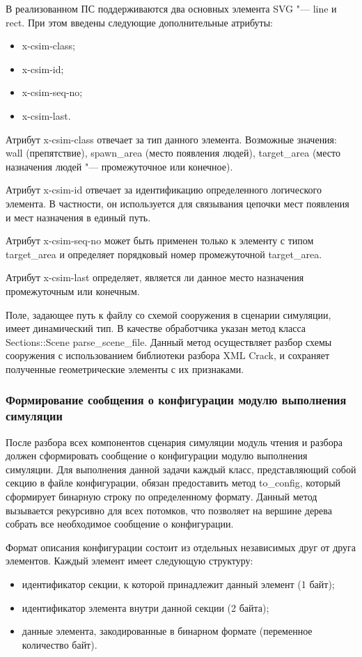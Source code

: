 В реализованном ПС поддерживаются два основных элемента SVG "--- line и rect.
При этом введены следующие дополнительные атрибуты:
\begin{itemize}
  \item x-csim-class;
  \item x-csim-id;
  \item x-csim-seq-no;
  \item x-csim-last.
\end{itemize}

Атрибут x-csim-class отвечает за тип данного элемента.
Возможные значения:
  wall (препятствие),
  spawn\_area (место появления людей),
  target\_area (место назначения людей "--- промежуточное или конечное).

Атрибут x-csim-id отвечает за идентификацию определенного логического элемента.
В частности, он используется для связывания цепочки мест появления и мест назначения в единый путь.

Атрибут x-csim-seq-no может быть применен только к элементу с типом target\_area и определяет порядковый номер промежуточной target\_area.

Атрибут x-csim-last определяет, является ли данное место назначения промежуточным или конечным.

Поле, задающее путь к файлу со схемой сооружения в сценарии симуляции, имеет динамический тип.
В качестве обработчика указан метод класса Sections::Scene parse\_scene\_file.
Данный метод осуществляет разбор схемы сооружения с использованием библиотеки разбора XML Crack, и сохраняет полученные геометрические элементы с их признаками.

\subsubsection{Формирование сообщения о конфигурации модулю выполнения симуляции}
\label{sec:development:preprocessor:format}

После разбора всех компонентов сценария симуляции модуль чтения и разбора должен сформировать сообщение о конфигурации модулю выполнения симуляции.
Для выполнения данной задачи каждый класс, представляющий собой секцию в файле конфигурации, обязан предоставить метод to\_config, который сформирует бинарную строку по определенному формату.
Данный метод вызывается рекурсивно для всех потомков, что позволяет на вершине дерева собрать все необходимое сообщение о конфигурации.

Формат описания конфигурации состоит из отдельных независимых друг от друга элементов.
Каждый элемент имеет следующую структуру:
\begin{itemize}
  \item идентификатор секции, к которой принадлежит данный элемент (1 байт);
  \item идентификатор элемента внутри данной секции (2 байта);
  \item данные элемента, закодированные в бинарном формате (переменное количество байт).
\end{itemize}


